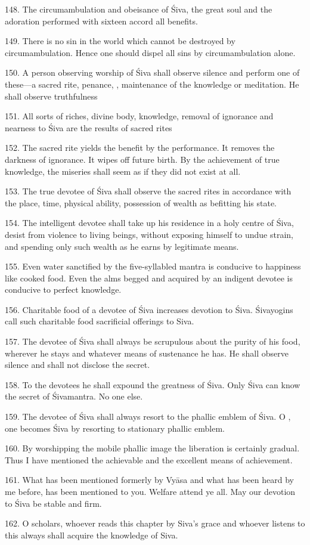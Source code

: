 148. The circumambulation and obeisance of Śiva, the great soul and
the adoration performed with sixteen  accord all benefits.

149. There is no sin in the world which cannot be destroyed by circumambulation.
Hence one should dispel all sins by circumambulation alone.

150. A person observing worship of Śiva shall observe silence and perform one of
these—a sacred rite, penance, , maintenance of the knowledge or
meditation. He shall observe truthfulness \etc

151. All sorts of riches, divine body, knowledge, removal of ignorance and
nearness to Śiva are the results of sacred rites \etc

152. The sacred rite yields the benefit by the performance. It removes
the darkness of ignorance. It wipes off future birth. By the achievement of
true knowledge, the miseries shall seem as if they did not exist at all.

153. The true devotee of Śiva shall observe the sacred rites \etc in accordance
with the place, time, physical ability, possession of wealth as befitting his
state.

154. The intelligent devotee shall take up his residence in a holy centre of
Śiva, desist from violence to living beings, without exposing himself to undue
strain, and spending only such wealth as he earns by legitimate means.

155. Even water sanctified by the five-syllabled mantra is conducive to
happiness like cooked food. Even the alms begged and acquired by an indigent
devotee is conducive to perfect knowledge.

156. Charitable food of a devotee of Śiva increases devotion to Śiva. Śivayogins
call such charitable food sacrificial offerings to Siva.

157. The devotee of Śiva shall always be scrupulous about the purity of his food,
wherever he stays and whatever means of sustenance he has. He shall observe
silence and shall not disclose the secret.

158. To the devotees he shall expound the greatness of Śiva. Only Śiva can know
the secret of Śivamantra. No one else.

159. The devotee of Śiva shall always resort to the phallic emblem of Śiva.
O , one becomes Śiva by resorting to stationary phallic emblem.

160. By worshipping the mobile phallic image the liberation is certainly gradual.
Thus I have mentioned the achievable and the excellent means of achievement.

161. What has been mentioned formerly by Vyāsa and what has been heard by me
before, has been mentioned to you. Welfare attend ye all. May our devotion to
Śiva be stable and firm.

162. O scholars, whoever reads this chapter by Siva’s grace and whoever listens
to this always shall acquire the knowledge of Siva.
